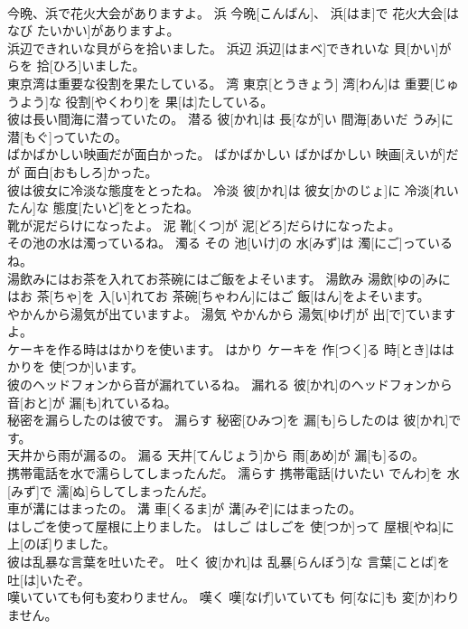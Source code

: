 \documentclass[8pt]{extreport}
\begin{document}
\begin{CJK}{UTF8}{min}
\\	今晩、浜で花火大会がありますよ。	浜	今晩[こんばん]、 浜[はま]で 花火大会[はなび たいかい]がありますよ。	
\\	浜辺できれいな貝がらを拾いました。	浜辺	浜辺[はまべ]できれいな 貝[かい]がらを 拾[ひろ]いました。	
\\	東京湾は重要な役割を果たしている。	湾	東京[とうきょう] 湾[わん]は 重要[じゅうよう]な 役割[やくわり]を 果[は]たしている。	
\\	彼は長い間海に潜っていたの。	潜る	彼[かれ]は 長[なが]い 間海[あいだ うみ]に 潜[もぐ]っていたの。	
\\	ばかばかしい映画だが面白かった。	ばかばかしい	ばかばかしい 映画[えいが]だが 面白[おもしろ]かった。	
\\	彼は彼女に冷淡な態度をとったね。	冷淡	彼[かれ]は 彼女[かのじょ]に 冷淡[れいたん]な 態度[たいど]をとったね。	
\\	靴が泥だらけになったよ。	泥	靴[くつ]が 泥[どろ]だらけになったよ。	
\\	その池の水は濁っているね。	濁る	その 池[いけ]の 水[みず]は 濁[にご]っているね。	
\\	湯飲みにはお茶を入れてお茶碗にはご飯をよそいます。	湯飲み	湯飲[ゆの]みにはお 茶[ちゃ]を 入[い]れてお 茶碗[ちゃわん]にはご 飯[はん]をよそいます。	
\\	やかんから湯気が出ていますよ。	湯気	やかんから 湯気[ゆげ]が 出[で]ていますよ。	
\\	ケーキを作る時ははかりを使います。	はかり	ケーキを 作[つく]る 時[とき]ははかりを 使[つか]います。	
\\	彼のヘッドフォンから音が漏れているね。	漏れる	彼[かれ]のヘッドフォンから 音[おと]が 漏[も]れているね。	
\\	秘密を漏らしたのは彼です。	漏らす	秘密[ひみつ]を 漏[も]らしたのは 彼[かれ]です。	
\\	天井から雨が漏るの。	漏る	天井[てんじょう]から 雨[あめ]が 漏[も]るの。	
\\	携帯電話を水で濡らしてしまったんだ。	濡らす	携帯電話[けいたい でんわ]を 水[みず]で 濡[ぬ]らしてしまったんだ。	
\\	車が溝にはまったの。	溝	車[くるま]が 溝[みぞ]にはまったの。	
\\	はしごを使って屋根に上りました。	はしご	はしごを 使[つか]って 屋根[やね]に 上[のぼ]りました。	
\\	彼は乱暴な言葉を吐いたぞ。	吐く	彼[かれ]は 乱暴[らんぼう]な 言葉[ことば]を 吐[は]いたぞ。	
\\	嘆いていても何も変わりません。	嘆く	嘆[なげ]いていても 何[なに]も 変[か]わりません。	

\end{CJK}
\end{document}
